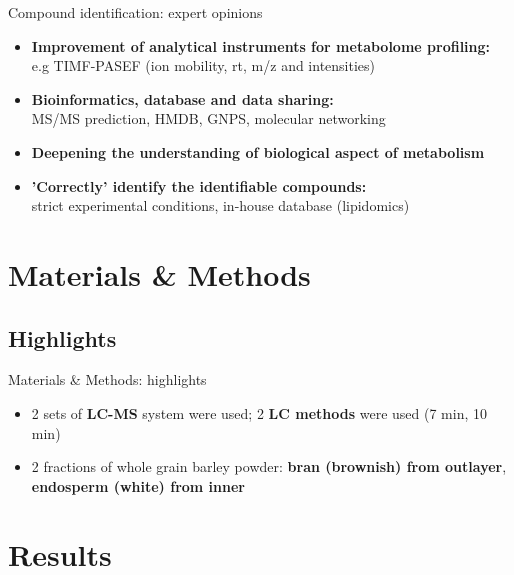 \documentclass{beamer}
\begin{document}
\begin{frame}{Compound identification: expert opinions}
\begin{itemize}
	\item \textbf{Improvement of analytical instruments for metabolome profiling:}\\ 
	e.g TIMF-PASEF (ion mobility, rt, m/z and intensities)
	\item \textbf{Bioinformatics, database and data sharing:}\\
	MS/MS prediction, HMDB, GNPS, molecular networking
	\item \textbf{Deepening the understanding of biological aspect of metabolism}
	\item \textbf{'Correctly' identify the identifiable compounds:}\\
	strict experimental conditions, in-house database (lipidomics)
	
\end{itemize}
\end{frame}

\section{Materials \& Methods}
\subsection{Highlights}
\begin{frame}{Materials \& Methods: highlights}
\begin{itemize}
\item 2 sets of \textbf{LC-MS} system were used; 2 \textbf{LC methods} were used (7 min, 10 min)
\item 2 fractions of whole grain barley powder: \textbf{bran (brownish) from outlayer}, \textbf{endosperm (white) from inner}
\end{itemize}
\end {frame}

\section{Results}
\end{document}

